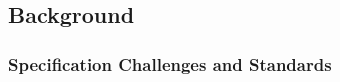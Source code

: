 \documentclass[lettersize,journal]{IEEEtran}
\begin{document}
\subsection{Background}\label{background}

\subsubsection{Specification Challenges and Standards}
%
%
\end{document}
